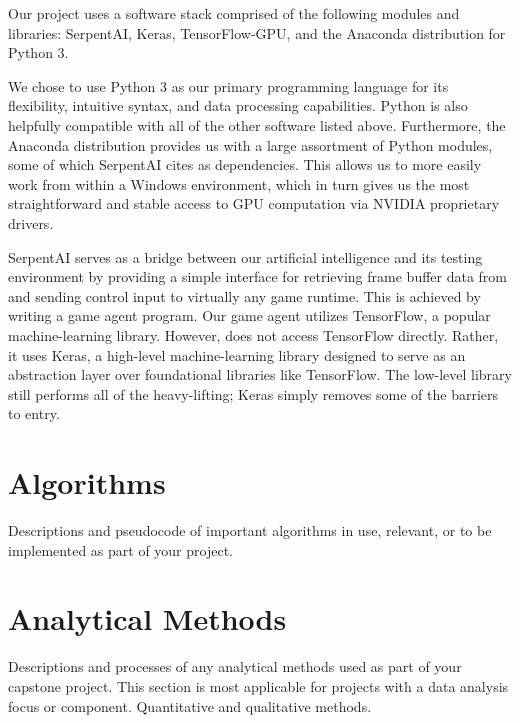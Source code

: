 Our project uses a software stack comprised of the following modules and libraries: SerpentAI, Keras, TensorFlow-GPU, and the Anaconda distribution for Python 3.

We chose to use Python 3 as our primary programming language for its flexibility, intuitive syntax, and data processing capabilities. Python is also helpfully compatible with all of the other software listed above. Furthermore, the Anaconda distribution provides us with a large assortment of Python modules, some of which SerpentAI cites as dependencies. This allows us to more easily work from within a Windows environment, which in turn gives us the most straightforward and stable access to GPU computation via NVIDIA proprietary drivers.

SerpentAI serves as a bridge between our artificial intelligence and its testing environment by providing a simple interface for retrieving frame buffer data from and sending control input to virtually any game runtime. This is achieved by writing a game agent program. Our game agent utilizes TensorFlow, a popular machine-learning library. However, does not access TensorFlow directly. Rather, it uses Keras, a high-level machine-learning library designed to serve as an abstraction layer over foundational libraries like TensorFlow. The low-level library still performs all of the heavy-lifting; Keras simply removes some of the barriers to entry.




\section{Algorithms}

Descriptions and pseudocode of important algorithms in use, relevant, or to be implemented as part of your project.




\section{Analytical Methods}

Descriptions and processes of any analytical methods used as part of your capstone project. This section is most applicable for projects with a data analysis focus or component. Quantitative and qualitative methods.

